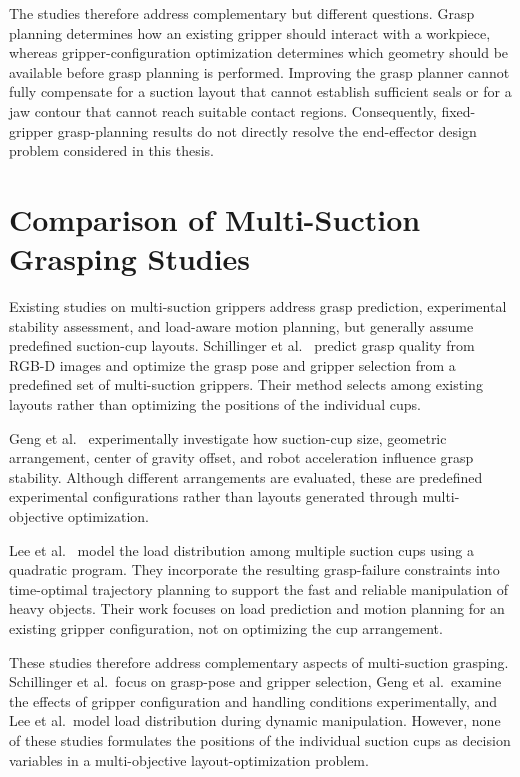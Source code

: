 The studies therefore address complementary but different questions. Grasp planning determines how an existing gripper should interact with a
workpiece, whereas gripper-configuration optimization determines which geometry should be available before grasp planning is performed. Improving the
grasp planner cannot fully compensate for a suction layout that cannot establish sufficient seals or for a jaw contour that cannot reach suitable
contact regions. Consequently, fixed-gripper grasp-planning results do not directly resolve the end-effector design problem considered in this thesis.

\section{Comparison of Multi-Suction Grasping Studies}

Existing studies on multi-suction grippers address grasp prediction, experimental stability assessment, and load-aware motion planning, but generally
assume predefined suction-cup layouts. Schillinger et al.\ \cite{Schillinger2023Model-Free} predict grasp quality from RGB-D images and optimize the
grasp pose and gripper selection from a predefined set of multi-suction grippers. Their method selects among existing layouts rather than optimizing
the positions of the individual cups.

Geng et al.\ \cite{Geng2025Experimental} experimentally investigate how suction-cup size, geometric arrangement, center of gravity offset, and robot
acceleration influence grasp stability. Although different arrangements are evaluated, these are predefined experimental configurations rather than
layouts generated through multi-objective optimization.

Lee et al.\ \cite{Lee2024Grasp} model the load distribution among multiple suction cups using a quadratic program. They incorporate the resulting
grasp-failure constraints into time-optimal trajectory planning to support the fast and reliable manipulation of heavy objects. Their work focuses on
load prediction and motion planning for an existing gripper configuration, not on optimizing the cup arrangement.

These studies therefore address complementary aspects of multi-suction grasping. Schillinger et al.\ focus on grasp-pose and gripper selection, Geng
et al.\ examine the effects of gripper configuration and handling conditions experimentally, and Lee et al.\ model load distribution during dynamic
manipulation. However, none of these studies formulates the positions of the individual suction cups as decision variables in a multi-objective
layout-optimization problem.

